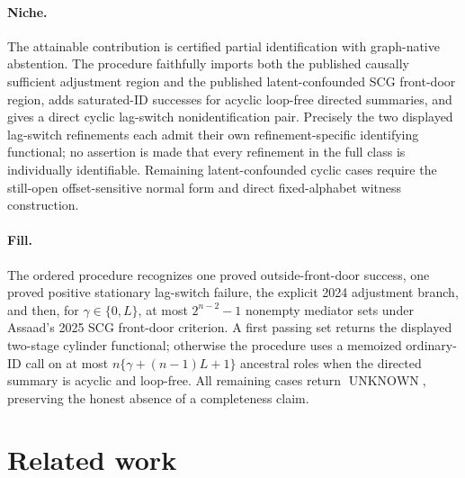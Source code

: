 \documentclass{article}
\begin{document}
\paragraph{Niche.} The attainable contribution is certified partial identification with graph-native abstention. The procedure faithfully imports both the published causally sufficient adjustment region and the published latent-confounded SCG front-door region, adds saturated-ID successes for acyclic loop-free directed summaries, and gives a direct cyclic lag-switch nonidentification pair. Precisely the two displayed lag-switch refinements each admit their own refinement-specific identifying functional; no assertion is made that every refinement in the full class is individually identifiable. Remaining latent-confounded cyclic cases require the still-open offset-sensitive normal form and direct fixed-alphabet witness construction.

\paragraph{Fill.} The ordered procedure recognizes one proved outside-front-door success, one proved positive stationary lag-switch failure, the explicit 2024 adjustment branch, and then, for \(\gamma\in\{0,L\}\), at most \(2^{n-2}-1\) nonempty mediator sets under Assaad's 2025 SCG front-door criterion. A first passing set returns the displayed two-stage cylinder functional; otherwise the procedure uses a memoized ordinary-ID call on at most \(n\{\gamma+(n-1)L+1\}\) ancestral roles when the directed summary is acyclic and loop-free. All remaining cases return \(\operatorname{UNKNOWN}\), preserving the honest absence of a completeness claim.

\section{Related work}
\end{document}
